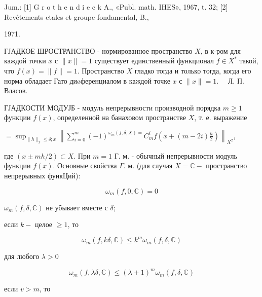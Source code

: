 \documentclass[10pt]{article}
\begin{document}
Jum.: [1] G r o t h e n d i e c k A., «Publ. math. IHES», 1967, t. 32; [2] Revêtements etales et groupe fondamental, B.,

1971.



ГЈАДКОЕ ШРОСТРАНСТВО - нормированное пространство $X$, в к-ром для каждой точки $x$ с $\|x\|=1$ существует единственный функционал $f \in X^{*}$ такой, что $f(x)=\|f\|=1$. Пространство $X$ гладко тогда и только тогда, когда его норма обладает Гато диøференциалом в каждой точке $x$ с $\|x\|=1 . \quad$ Л. П. Власов.



ГЈАДКОСТИ МОДУЈБ - модуль непрерывности производной порядка $m \geqslant 1$ функции $f(x)$, определенной на банаховом пространстве $X$, т. е. выражение



$=\sup _{\|h\|_{x} \leqslant \delta ; x}\left\|\sum_{i=0}^{m}(-1)^{\omega_{m}(f, \delta, X)=} C_{m}^{i} f\left(x+(m-2 i) \frac{h}{2}\right)\right\|_{X^{2}}$,



где $(x \pm m h / 2) \subset X$. При $m=1$ Г. м. - обычный непрерывности модуль функции $f(x)$. Основные свойства $\Gamma$. м. (для случая $X=\mathbb{C}-$ пространство непрерывных функЦий):



\[

\omega_{m}(f, 0, \mathbb{C})=0

\]



$\omega_{m}(f, \delta, \mathbb{C})$ не убывает вместе с $\delta$;



если $k-$ целое $\geqslant 1$, то



\[

\omega_{m}(f, k \delta, \mathbb{C}) \leqslant k^{m} \omega_{m}(f, \delta, \mathbb{C})

\]



для любого $\lambda>0$



\[

\omega_{m}(f, \lambda \delta, \mathbb{C}) \leqslant(\lambda+1)^{m} \omega_{m}(f, \delta, \mathbb{C})

\]



если $v>m$, то
\end{document}
